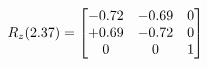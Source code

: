 \documentclass[preview]{standalone}
\begin{document}
\begin{align*}
\special{dvisvgm:raw <g id='unique000'>}R_{z}(2.37) = \begin{bmatrix}-0.72 & -0.69 & 0 \\+0.69 & -0.72 & 0 \\0 & 0 & 1\end{bmatrix}\special{dvisvgm:raw </g>}
\end{align*}
\end{document}
